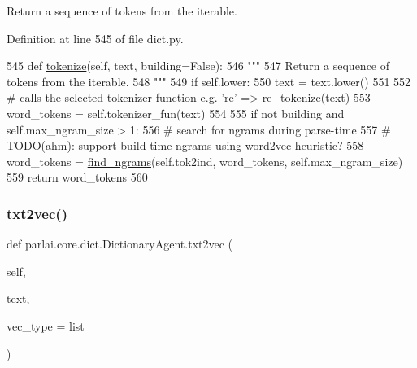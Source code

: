 \begin{DoxyVerb}Return a sequence of tokens from the iterable.
\end{DoxyVerb}
 

Definition at line 545 of file dict.\+py.


\begin{DoxyCode}
545     \textcolor{keyword}{def }\hyperlink{namespaceparlai_1_1agents_1_1tfidf__retriever_1_1build__tfidf_a1fdb457e98eb4e4c26047e229686a616}{tokenize}(self, text, building=False):
546         \textcolor{stringliteral}{"""}
547 \textcolor{stringliteral}{        Return a sequence of tokens from the iterable.}
548 \textcolor{stringliteral}{        """}
549         \textcolor{keywordflow}{if} self.lower:
550             text = text.lower()
551 
552         \textcolor{comment}{# calls the selected tokenizer function e.g. 're' => re\_tokenize(text)}
553         word\_tokens = self.tokenizer\_fun(text)
554 
555         \textcolor{keywordflow}{if} \textcolor{keywordflow}{not} building \textcolor{keywordflow}{and} self.max\_ngram\_size > 1:
556             \textcolor{comment}{# search for ngrams during parse-time}
557             \textcolor{comment}{# TODO(ahm): support build-time ngrams using word2vec heuristic?}
558             word\_tokens = \hyperlink{namespaceparlai_1_1core_1_1dict_a5e9eb43b6c0dce0b3aab7f3ea3717de6}{find\_ngrams}(self.tok2ind, word\_tokens, self.max\_ngram\_size)
559         \textcolor{keywordflow}{return} word\_tokens
560 
\end{DoxyCode}
\mbox{\label{classparlai_1_1core_1_1dict_1_1DictionaryAgent_abc3baf742422fc7cdaece698224709d4}} 
\subsubsection{\texorpdfstring{txt2vec()}{txt2vec()}}
{\footnotesize\ttfamily def parlai.\+core.\+dict.\+Dictionary\+Agent.\+txt2vec (\begin{DoxyParamCaption}\item[{}]{self,  }\item[{}]{text,  }\item[{}]{vec\+\_\+type = {\ttfamily list} }\end{DoxyParamCaption})}

